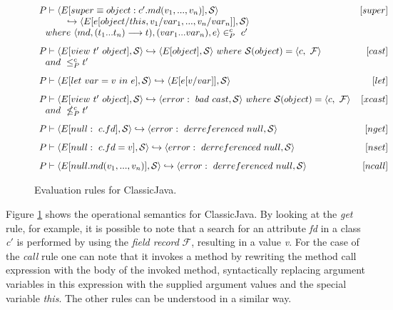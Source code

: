 \documentclass[tese,capa,english]{texufpel}
\begin{document}
\begin{figure}[t]
\[\begin{array}{lr}
P \vdash \langle E[super \equiv object: c'.md(v_1,...,v_n)], \mathcal{S} \rangle
&
[super]
\\
\ \ \ \ \ \ \ \ \ \hookrightarrow \langle E [e[object/this, v_1/var_1,...,v_n/var_n]], \mathcal{S} \rangle
&
\\
\ \ where \ \langle md, (t_1...t_n) --> t), (var_1...var_n), e \rangle \in^{c}_{P} \ c'
&
\vspace{8pt}
\\
P \vdash \langle E[view \ t' \ object], \mathcal{S} \rangle \hookrightarrow \langle E[object], \mathcal{S} \rangle \ where \ \mathcal{S}(object) = \langle c, \ \mathcal{F} \rangle 
&
[cast]
\\
\ \ and \ \le^{c}_{P} t'
&
\vspace{8pt}
\\
P \vdash \langle E[let \ var = v \ in \ e], \mathcal{S} \rangle \hookrightarrow \langle E[e[v/var]], \mathcal{S} \rangle 
&
[let]
\vspace{8pt}
\\
P \vdash \langle E[view \ t' \ object], \mathcal{S} \rangle \hookrightarrow \langle error: \ bad \ cast, \mathcal{S} \rangle \ where \ \mathcal{S}(object) = \langle c, \ \mathcal{F} \rangle 
&
[xcast]
\\
\ \ and \ \nleq^{c}_{P} t' 
&
\vspace{8pt}
\\
P \vdash \langle E[null: \ c.fd], \mathcal{S} \rangle \hookrightarrow \langle error: \ derreferenced \ null, \mathcal{S} \rangle 
&
[nget]
\vspace{8pt}
\\
P \vdash \langle E[null: \ c.fd = v], \mathcal{S} \rangle \hookrightarrow \langle error: \ derreferenced \ null, \mathcal{S} \rangle 
&
[nset]
\vspace{8pt}
\\
P \vdash \langle E[null.md(v_1,...,v_n)], \mathcal{S} \rangle \hookrightarrow \langle error: \ derreferenced \ null, \mathcal{S} \rangle 
&
[ncall]
\\
\end{array}
\]
\caption{Evaluation rules for ClassicJava.}
\label{fig:cj-eval}
\end{figure}

Figure \ref{fig:cj-eval} shows the operational semantics for ClassicJava. By looking at the \emph{get} rule, for example, it is possible to note that a search for an attribute \emph{fd} in a class \emph{c}$'$ is performed by using the \emph{field record} $\mathcal{F}$, resulting in a value \emph{v}. For the case of the \emph{call} rule one can note that it invokes a method by rewriting the method call expression with the body of the invoked method, syntactically replacing argument variables in this expression with the supplied argument values and the special variable \emph{this}. The other rules can be understood in a similar way. 
\end{document}
